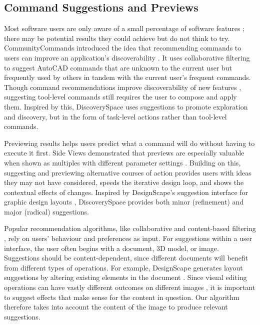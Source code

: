 \subsection{Command Suggestions and Previews}
Most software users are only aware of a small percentage of software features \cite{MM-gi2000}; there may be potential results they could achieve but do not think to try. CommunityCommands introduced the idea that recommending commands to users can improve an application's discoverability \cite{Li2011, Matejka2009}. It uses collaborative filtering to suggest AutoCAD commands that are unknown to the current user but frequently used by others in tandem with the current user's frequent commands. Though command recommendations improve discoverability of new features \cite{Li2011}, suggesting tool-level commands still requires the user to compose and apply them. Inspired by this, Discovery\-Space uses suggestions to promote exploration and discovery, but in the form of task-level actions rather than tool-level commands. 

Previewing results helps users predict what a command will do without having to execute it first. Side Views demonstrated that previews are especially valuable when shown as multiples with different parameter settings \cite{Terry2002}. Building on this, suggesting and previewing alternative courses of action provides users with ideas they may not have considered, speeds the iterative design loop, and shows the contextual effects of changes. Inspired by DesignScape's suggestion interface for graphic design layouts \cite{ODonovan2015}, Discovery\-Space provides both minor (refinement) and major (radical) suggestions.

Popular recommendation algorithms, like collaborative and content-based filtering \cite{Pazzani2007}, rely on users' behaviour and preferences as input. For suggestions within a user interface, the user often begins with a document, 3D model, or image. Suggestions should be content-dependent, since different documents will benefit from different types of operations. For example, DesignScape generates layout suggestions by altering existing elements in the document \cite{ODonovan2015}. Since visual editing operations can have vastly different outcomes on different images \cite{Berthouzoz2011}, it is important to suggest effects that make sense for the content in question. Our algorithm therefore takes into account the content of the image to produce relevant suggestions.

